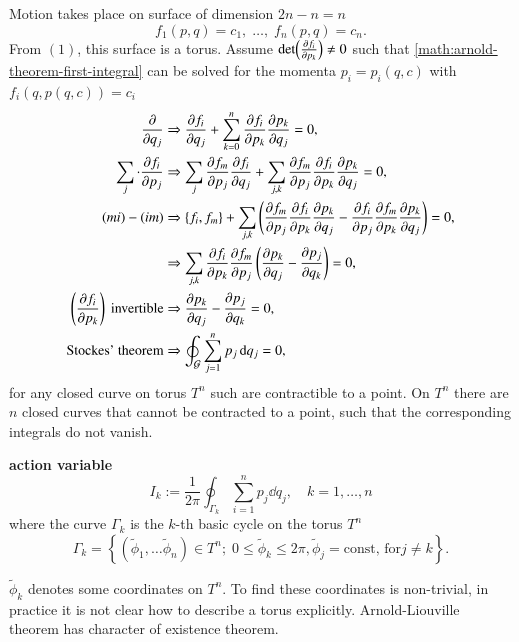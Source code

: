 Motion takes place on surface of dimension $2n -n = n$
\begin{equation}
	f_1 (p,q) = c_1,\; \dots,\; f_n(p, q) = c_n .
	\label{math:arnold-theorem-first-integral}
\end{equation}
From $(1)$, this surface is a torus. Assume $\det(\pdv{f_i}{p_k}) \neq 0$ such that \eqref{math:arnold-theorem-first-integral} can be solved for the momenta $p_i = p_i (q, c)$ with $f_i(q, p(q,c )) = c_i$
\begin{align*}
	\pdv{q_j} & \Rightarrow \pdv{f_i}{q_j} + \sum_{k=0}^{n} \pdv{f_i}{p_k} \pdv{p_k}{q_j} = 0, \\
	 \sum_j \cdot \pdv{f_i}{p_j} &\Rightarrow \sum_j \pdv{f_m}{p_j} \pdv{f_i}{q_j} + \sum_{j, k} \pdv{f_m}{p_j}\pdv{f_i}{p_k} \pdv{p_k}{q_j} = 0, \\
	(mi) - (im) &\Rightarrow \pb{f_i}{f_m} + \sum_{j, k} \left( \pdv{f_m}{p_j} \pdv{f_i}{p_k} \pdv{p_k}{q_j} - \pdv{f_i}{p_j} \pdv{f_m}{p_k} \pdv{p_k}{q_j} \right)  = 0, \\
					&\Rightarrow \sum_{j, k} \pdv{f_i}{p_k} \pdv{f_m}{p_j} \left( \pdv{p_k}{q_j} - \pdv{p_j}{q_k} \right)  = 0, \\
	\left( \pdv{f_i}{p_k} \right) \text{ invertible} &\Rightarrow \pdv{p_k}{q_j} - \pdv{p_j}{q_k} = 0, \\
	\text{Stockes' theorem} &\Rightarrow \oint_{\mathcal{G}} \sum_{j=1}^{n} p_j \dd{q_j} = 0,
\end{align*}
for any closed curve on torus $T^n$ such are contractible to a point. On $T^n$ there are $n$ closed curves that cannot be contracted to a point, such that the corresponding integrals do not vanish.

\begin{definition}
\textbf{action variable}
\begin{equation}
	I_k := \frac{1}{2\pi} \oint_{\Gamma_k} \sum_{i=1}^{n} p_j \dd{q_j}, \quad k = 1, \dots, n
	\label{math:action-variable-def}
\end{equation}
where the curve $\Gamma_k$ is the $k$-th basic cycle on the torus $T^n$
\begin{equation*}
\Gamma_k = \left\{ (\tilde{\phi}_1, \dots \tilde{\phi}_n) \in T^n;\; 0 \leq \tilde{\phi}_k \leq 2\pi, \tilde{\phi}_j = \text{const, for} j\neq k  \right\}.
\end{equation*}

\end{definition}
$\tilde{\phi}_k$ denotes some coordinates on $T^n$. To find these coordinates is non-trivial, in practice it is not clear how to describe a torus explicitly. Arnold-Liouville theorem has character of existence theorem. 

